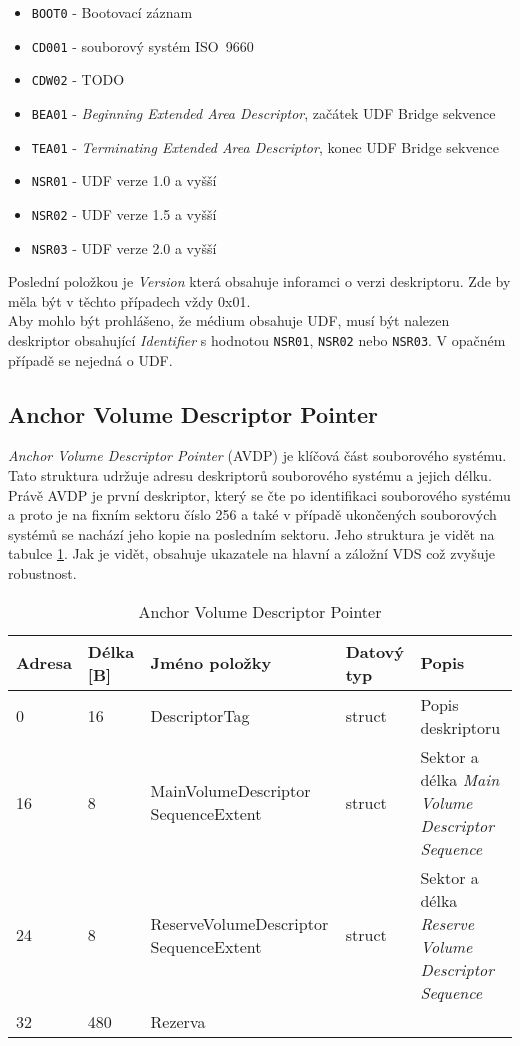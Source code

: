 \begin{itemize}
    \item \texttt{BOOT0} - Bootovací záznam
    \item \texttt{CD001} - souborový systém ISO~9660
    \item \texttt{CDW02} - TODO
    \item \texttt{BEA01} - \textit{Beginning Extended Area Descriptor}, začátek UDF Bridge sekvence
    \item \texttt{TEA01} - \textit{Terminating Extended Area Descriptor}, konec UDF Bridge sekvence
    \item \texttt{NSR01} - UDF verze 1.0 a vyšší
    \item \texttt{NSR02} - UDF verze 1.5 a vyšší
    \item \texttt{NSR03} - UDF verze 2.0 a vyšší
\end{itemize}
Poslední položkou je \textit{Version} která obsahuje inforamci o verzi deskriptoru. Zde by měla být v těchto případech vždy 0x01.\\
Aby mohlo být prohlášeno, že médium obsahuje UDF, musí být nalezen deskriptor obsahující \textit{Identifier} s hodnotou \texttt{NSR01}, \texttt{NSR02} nebo \texttt{NSR03}. V opačném případě se nejedná o UDF.

\subsection{Anchor Volume Descriptor Pointer}
\textit{Anchor Volume Descriptor Pointer} (AVDP) je klíčová část souborového systému. Tato struktura udržuje adresu deskriptorů souborového systému a jejich délku. Právě AVDP je první deskriptor, který se čte po identifikaci souborového systému a proto je na fixním sektoru číslo 256 a také v případě ukončených souborových systémů se nachází jeho kopie na posledním sektoru. Jeho struktura je vidět na tabulce \ref{tab-avdp}. Jak je vidět, obsahuje ukazatele na hlavní a záložní VDS což zvyšuje robustnost.
\begin{table}
    \begin{tabular}{ | l | l | p{4.5cm} | p{1.3cm} | p{5.5cm} | }
        \hline
        Adresa  & Délka [B]   & Jméno položky & Datový typ    & Popis \\ \hline
        0       & 16          & DescriptorTag & struct        & Popis deskriptoru \\ \hline
        16      & 8           & MainVolumeDescriptor SequenceExtent & struct & Sektor a délka \textit{Main Volume Descriptor Sequence} \\ \hline
        24      & 8           & ReserveVolumeDescriptor SequenceExtent & struct & Sektor a délka \textit{Reserve Volume Descriptor Sequence} \\ \hline
        32      & 480         & Rezerva & & \\ \hline
    \end{tabular}
    \caption{Anchor Volume Descriptor Pointer\label{tab-avdp}}
\end{table}

